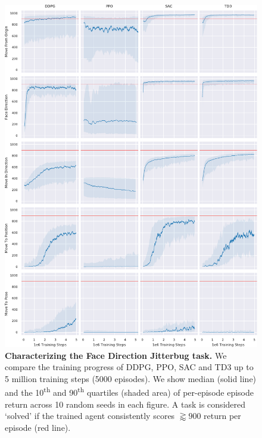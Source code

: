 \documentclass{article}
\begin{document}
\begin{figure}[p]
	\vspace*{-24pt}
	\centering
	\includegraphics[width=\linewidth]{fig-rl-perf}
	
	\caption{
		\textbf{Characterizing the Face Direction Jitterbug task.}
		We compare the training progress of DDPG, PPO, SAC and TD3 up to 5 million training steps (5000 episodes).
		We show median (solid line) and the 10\textsuperscript{th} and 90\textsuperscript{th} quartiles (shaded area) of per-episode episode return across 10 random seeds in each figure.
		A task is considered `solved' if the trained agent consistently scores $\gtrapprox 900$ return per episode (red line).
	}
	\label{fig:rl-perf}
\end{figure}



\pagebreak


\end{document}

